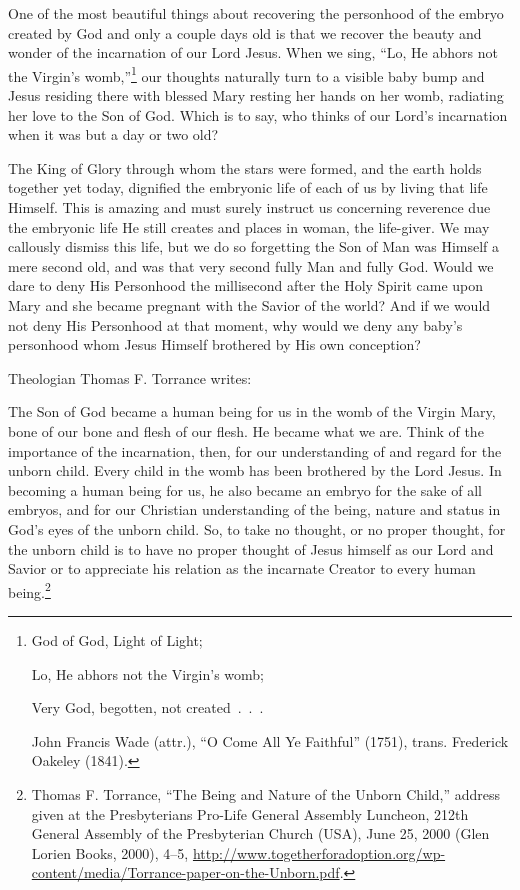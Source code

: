 \documentclass[
]{book}
\begin{document}
One of the most beautiful things about recovering the personhood of the embryo created by God and only a couple days old is that we recover the beauty and wonder of the incarnation of our Lord Jesus. When we sing, ``Lo, He abhors not the Virgin's womb,''\footnote{God of God, Light of Light;

  Lo, He abhors not the Virgin's womb;

  Very God, begotten, not created~.~.~.

  John Francis Wade (attr.), ``O Come All Ye Faithful'' (1751), trans. Frederick Oakeley (1841).} our thoughts naturally turn to a visible baby bump and Jesus residing there with blessed Mary resting her hands on her womb, radiating her love to the Son of God. Which is to say, who thinks of our Lord's incarnation when it was but a day or two old?

The King of Glory through whom the stars were formed, and the earth holds together yet today, dignified the embryonic life of each of us by living that life Himself. This is amazing and must surely instruct us concerning reverence due the embryonic life He still creates and places in woman, the life-giver. We may callously dismiss this life, but we do so forgetting the Son of Man was Himself a mere second old, and was that very second fully Man and fully God. Would we dare to deny His Personhood the millisecond after the Holy Spirit came upon Mary and she became pregnant with the Savior of the world? And if we would not deny His Personhood at that moment, why would we deny any baby's personhood whom Jesus Himself brothered by His own conception?

Theologian Thomas F. Torrance writes:

The Son of God became a human being for us in the womb of the Virgin Mary, bone of our bone and flesh of our flesh. He became what we are. Think of the importance of the incarnation, then, for our understanding of and regard for the unborn child. Every child in the womb has been brothered by the Lord Jesus. In becoming a human being for us, he also became an embryo for the sake of all embryos, and for our Christian understanding of the being, nature and status in God's eyes of the unborn child. So, to take no thought, or no proper thought, for the unborn child is to have no proper thought of Jesus himself as our Lord and Savior or to appreciate his relation as the incarnate Creator to every human being.\footnote{Thomas F. Torrance, ``The Being and Nature of the Unborn Child,'' address given at the Presbyterians Pro-Life General Assembly Luncheon, 212th General Assembly of the Presbyterian Church (USA), June 25, 2000 (Glen Lorien Books, 2000), 4--5, \url{http://www.togetherforadoption.org/wp-content/media/Torrance-paper-on-the-Unborn.pdf}.}
\end{document}
